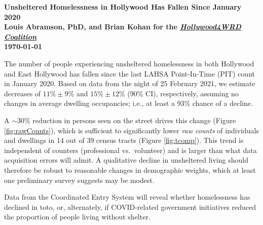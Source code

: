 \documentclass[11pt]{article}
\def\resp{respectively}
\begin{document}

\begin{center}
	\Large\bf Unsheltered Homelessness in Hollywood Has Fallen Since January 2020\\
	\vspace{1ex}
	{\normalsize\rm Louis Abramson, PhD, and Brian Kohan 
	for the \href{http://www.hollywood4wrd.live}{\it Hollywood4WRD Coalition} \\ \today}


\end{center}

 The number of people experiencing unsheltered homelessness in both Hollywood 
and East Hollywood has fallen since the last LAHSA Point-In-Time (PIT) count in January 2020. Based on data 
from the night of 25 February 2021, we estimate decreases of $11\%\pm9\%$ and $15\%\pm12\%$ (90\% CI), 
\resp, assuming no changes in average dwelling occupancies; i.e., at least a 93\% chance of a decline.

A $\sim$30\% reduction in persons seen on the street drives this change (Figure \ref{fig:rawCounts}), which is 
sufficient to significantly lower {\it raw counts} of individuals and dwellings in 14 out of 39 census tracts (Figure 
\ref{fig:tcomp}). 
This trend is independent of counters (professional vs.\ volunteer) and is larger than what data acquisition errors 
will admit. A qualitative decline in unsheltered living should therefore be robust to reasonable changes in 
demographic weights, which at least one preliminary survey suggests may be modest.

Data from the Coordinated Entry System will reveal whether homelessness has declined in toto, or, alternately,
if COVID-related government initiatives reduced the proportion of people living without shelter.
\end{document}
